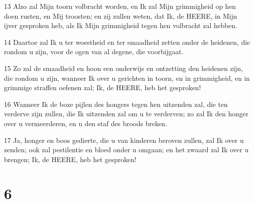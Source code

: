 \par 13 Alzo zal Mijn toorn volbracht worden, en Ik zal Mijn grimmigheid op hen doen rusten, en Mij troosten; en zij zullen weten, dat Ik, de HEERE, in Mijn ijver gesproken heb, als Ik Mijn grimmigheid tegen hen volbracht zal hebben.
\par 14 Daartoe zal Ik u ter woestheid en ter smaadheid zetten onder de heidenen, die rondom u zijn, voor de ogen van al degene, die voorbijgaat.
\par 15 Zo zal de smaadheid en hoon een onderwijs en ontzetting den heidenen zijn, die rondom u zijn, wanneer Ik over u gerichten in toorn, en in grimmigheid, en in grimmige straffen oefenen zal; Ik, de HEERE, heb het gesproken!
\par 16 Wanneer Ik de boze pijlen des hongers tegen hen uitzenden zal, die ten verderve zijn zullen, die Ik uitzenden zal om u te verderven; zo zal Ik den honger over u vermeerderen, en u den staf des broods breken.
\par 17 Ja, honger en boos gedierte, die u van kinderen beroven zullen, zal Ik over u zenden; ook zal pestilentie en bloed onder u omgaan; en het zwaard zal Ik over u brengen; Ik, de HEERE, heb het gesproken!

\chapter{6}

